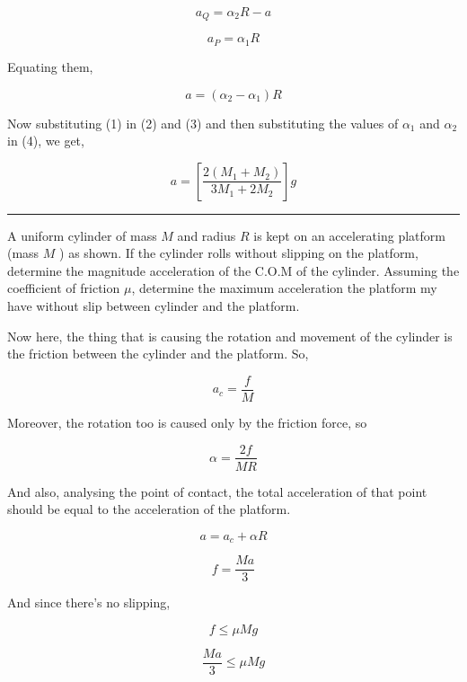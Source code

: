 \documentclass[twocolumn]{article}
\begin{document}
\begin{CJK*}{UTF8}{gbsn}
\[
    a_{Q} = \alpha_2 R - a 
\]

\[
    a_{P} = \alpha_1 R 
\]

Equating them, 

\[
    a = (\alpha_2 - \alpha_1) R \tag{4}
\]

Now substituting (1) in (2) and (3) and then substituting the values of \(\alpha_1\) and \(\alpha_2\) in (4), we get, 

\[
    \boxed{a = [\frac{2(M_1 + M_2)}{3M_1 + 2M_2}]g}
\]

\vspace{0.1in}
\hrule

\begin{question}
    A uniform cylinder of mass \(M\) and radius \(R\) is kept on an accelerating platform (mass \(M\) ) as shown. If the cylinder rolls without slipping on the platform, determine the magnitude acceleration of the C.O.M of the cylinder. Assuming the coefficient of friction \(\mu\), determine the maximum acceleration the platform my have without slip between cylinder and the platform. 
    \begin{center}
    \end{center}
\end{question}

Now here, the thing that is causing the rotation and movement of the cylinder is the friction between the cylinder and the platform. So,

\[
    a_c = \frac{f}{M}
\]

Moreover, the rotation too is caused only by the friction force, so 

\[
    \alpha = \frac{2f}{M R}
\]

And also, analysing the point of contact, the total acceleration of that point should be equal to the acceleration of the platform. 

\[
    a = a_c + \alpha R
\]

\[
    f = \frac{Ma}{3}
\]

And since there's no slipping, 

\[
    f \leq  \mu Mg
\]

\[
    \frac{Ma}{3} \leq  \mu Mg
\]


\end{CJK*}
\end{document}
